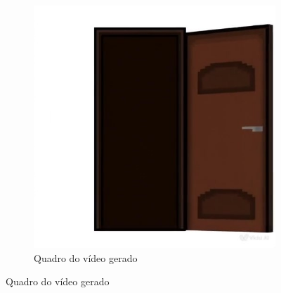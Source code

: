 \begin{figure}[htbp]
\begin{subfigure}{0.35\linewidth}
        \includegraphics[width=1\linewidth]{figs/vidu/framePortaAberta.jpg}
        \caption{\small Quadro do vídeo gerado}
        \label{fig:vidu15d}
    \end{subfigure}
\end{figure}

